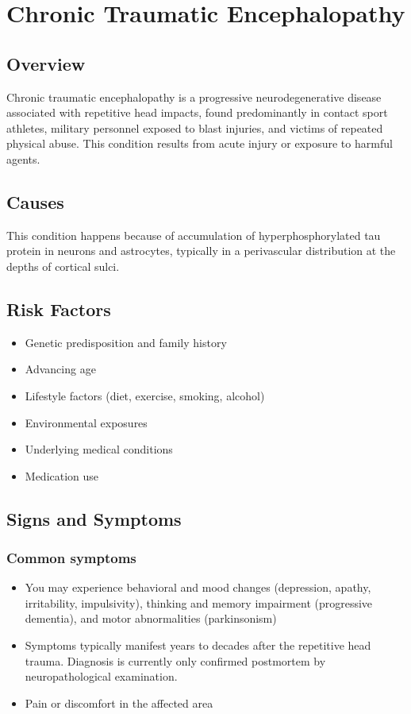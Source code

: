 \chapter{Chronic Traumatic Encephalopathy}
\label{sec:Chronic Traumatic Encephalopathy}

\section{Overview}
Chronic traumatic encephalopathy is a progressive neurodegenerative disease associated with repetitive head impacts, found predominantly in contact sport athletes, military personnel exposed to blast injuries, and victims of repeated physical abuse. This condition results from acute injury or exposure to harmful agents.
\section{Causes}
This condition happens because of accumulation of hyperphosphorylated tau protein in neurons and astrocytes, typically in a perivascular distribution at the depths of cortical sulci.     
\section{Risk Factors}

\begin{itemize}[noitemsep]
  \item Genetic predisposition and family history
  \item Advancing age
  \item Lifestyle factors (diet, exercise, smoking, alcohol)
  \item Environmental exposures
  \item Underlying medical conditions
  \item Medication use
\end{itemize}
\section{Signs and Symptoms}

\subsection{Common symptoms}
\begin{itemize}[noitemsep]
  \item You may experience behavioral and mood changes (depression, apathy, irritability, impulsivity), thinking and memory impairment (progressive dementia), and motor abnormalities (parkinsonism)
  \item Symptoms typically manifest years to decades after the repetitive head trauma. Diagnosis is currently only confirmed postmortem by neuropathological examination.
  \item Pain or discomfort in the affected area
  \end{itemize}

